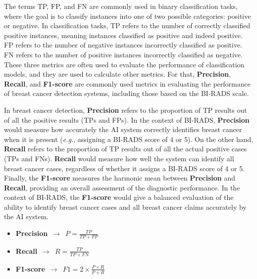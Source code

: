 The terms \acf{TP}, \acf{FP}, and \acf{FN} are commonly used in binary classification tasks, where the goal is to classify instances into one of two possible categories: positive or negative.
In classification tasks, \ac{TP} refers to the number of correctly classified positive instances, meaning instances classified as positive and indeed positive. \ac{FP} refers to the number of negative instances incorrectly classified as positive.
\ac{FN} refers to the number of positive instances incorrectly classified as negative.
These three metrics are often used to evaluate the performance of classification models, and they are used to calculate other metrics.
For that, {\bf Precision}, {\bf Recall}, and {\bf F1-score} are commonly used metrics in evaluating the performance of breast cancer detection systems, including those based on the \ac{BI-RADS} scale.

In breast cancer detection, {\bf Precision} refers to the proportion of \ac{TP} results out of all the positive results (\acp{TP} and \acp{FP}).
In the context of \ac{BI-RADS}, {\bf Precision} would measure how accurately the \ac{AI} system correctly identifies breast cancer when it is present ({\it e.g.}, assigning a \ac{BI-RADS} score of 4 or 5).
On the other hand, {\bf Recall} refers to the proportion of \ac{TP} results out of all the actual positive cases (\acp{TP} and \acp{FN}).
{\bf Recall} would measure how well the system can identify all breast cancer cases, regardless of whether it assigns a \ac{BI-RADS} score of 4 or 5.
Finally, the {\bf F1-score} measures the harmonic mean between {\bf Precision} and {\bf Recall}, providing an overall assessment of the diagnostic performance.
In the context of \ac{BI-RADS}, the {\bf F1-score} would give a balanced evaluation of the ability to identify breast cancer cases and all breast cancer claims accurately by the \ac{AI} system.


\vspace{2.00mm}

\begin{multicols}{3}
\centering
\begin{itemize}
\item[] {\bf Precision}~$\rightarrow$~$P = \frac{TP}{TP + FP}$
\item[] {\bf Recall}~$\rightarrow$~$R = \frac{TP}{TP + FN}$
\item[] {\bf F1-score}~$\rightarrow$~$F1 = 2 \times \frac{P \times R}{P + R}$
\end{itemize}
\end{multicols}

